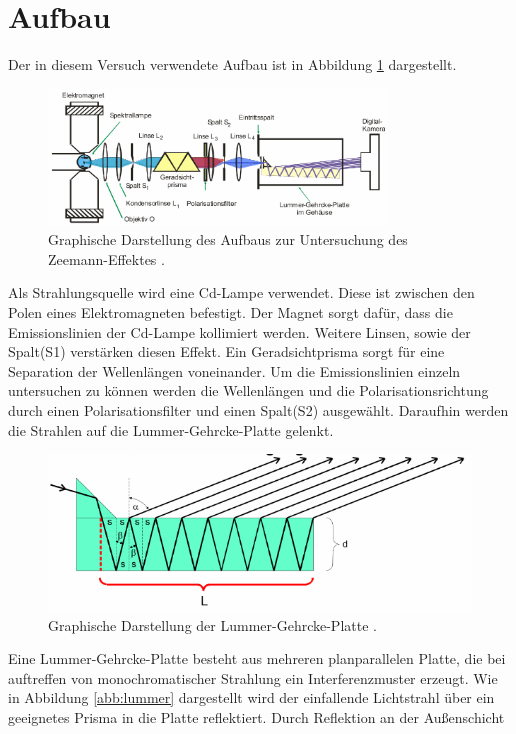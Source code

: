 \newpage
\section{Aufbau}
\label{sec:Aufbau}
Der in diesem Versuch verwendete Aufbau ist in Abbildung \ref{abb:aufbau} dargestellt.
\begin{figure}[htb]
  \centering
  \includegraphics[width=0.8\textwidth]{images/V27_7.pdf}
  \caption{Graphische Darstellung des Aufbaus zur Untersuchung des Zeemann-Effektes \cite{anleitung}.}
  \label{abb:aufbau}
\end{figure}
Als Strahlungsquelle wird eine Cd-Lampe verwendet. Diese ist zwischen den Polen
eines Elektromagneten befestigt. Der Magnet sorgt dafür, dass die Emissionslinien
der Cd-Lampe kollimiert werden. Weitere Linsen, sowie der Spalt(S1) verstärken
diesen Effekt. Ein
Geradsichtprisma sorgt für eine Separation der Wellenlängen voneinander. Um
die Emissionslinien einzeln untersuchen zu können werden die Wellenlängen und die
Polarisationsrichtung durch einen Polarisationsfilter und einen Spalt(S2) ausgewählt.
Daraufhin werden die Strahlen auf die Lummer-Gehrcke-Platte gelenkt.
\begin{figure}
  \includegraphics{images/V27_6.pdf}
  \caption{Graphische Darstellung der Lummer-Gehrcke-Platte \cite{anleitung}.}
  \label{}
\end{figure}
Eine Lummer-Gehrcke-Platte besteht aus mehreren planparallelen Platte, die bei
auftreffen von monochromatischer Strahlung ein Interferenzmuster erzeugt. Wie in
Abbildung \ref{abb:lummer} dargestellt wird der einfallende Lichtstrahl über ein
geeignetes Prisma in die Platte reflektiert. Durch Reflektion an der Außenschicht
